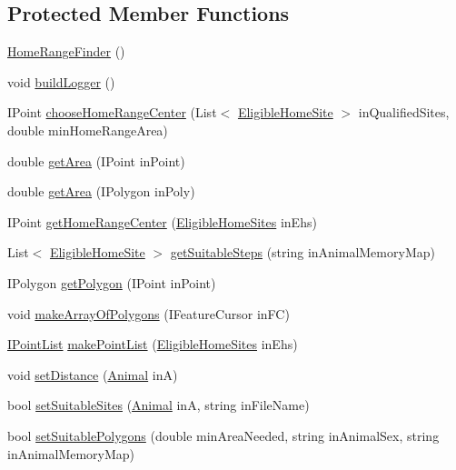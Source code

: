 \subsection*{Protected Member Functions}
\begin{DoxyCompactItemize}
\item 
\hyperlink{class_p_a_z___dispersal_1_1_home_range_finder_a850651d71e9dcdd3434d3696d0f44444}{Home\-Range\-Finder} ()
\item 
void \hyperlink{class_p_a_z___dispersal_1_1_home_range_finder_a0cbe3181c2c10f1f6977404cfd341a66}{build\-Logger} ()
\item 
I\-Point \hyperlink{class_p_a_z___dispersal_1_1_home_range_finder_aea846c132d588fca92f93125f582f30b}{choose\-Home\-Range\-Center} (List$<$ \hyperlink{class_p_a_z___dispersal_1_1_eligible_home_site}{Eligible\-Home\-Site} $>$ in\-Qualified\-Sites, double min\-Home\-Range\-Area)
\item 
double \hyperlink{class_p_a_z___dispersal_1_1_home_range_finder_ac018ed1452fede0440b55d438b7d65af}{get\-Area} (I\-Point in\-Point)
\item 
double \hyperlink{class_p_a_z___dispersal_1_1_home_range_finder_aad3d5999d17350b96371e34df54f5d4e}{get\-Area} (I\-Polygon in\-Poly)
\item 
I\-Point \hyperlink{class_p_a_z___dispersal_1_1_home_range_finder_a8a8b05ea5bf866138c1348ce67dce3c9}{get\-Home\-Range\-Center} (\hyperlink{class_p_a_z___dispersal_1_1_eligible_home_sites}{Eligible\-Home\-Sites} in\-Ehs)
\item 
List$<$ \hyperlink{class_p_a_z___dispersal_1_1_eligible_home_site}{Eligible\-Home\-Site} $>$ \hyperlink{class_p_a_z___dispersal_1_1_home_range_finder_a9a3fc1f66a4ff6aa1308f35eb627fa69}{get\-Suitable\-Steps} (string in\-Animal\-Memory\-Map)
\item 
I\-Polygon \hyperlink{class_p_a_z___dispersal_1_1_home_range_finder_a36671daba651e32270216fa9cc25bfba}{get\-Polygon} (I\-Point in\-Point)
\item 
void \hyperlink{class_p_a_z___dispersal_1_1_home_range_finder_ad778a5dc86e55382437c9ba0f0ea4c73}{make\-Array\-Of\-Polygons} (I\-Feature\-Cursor in\-F\-C)
\item 
\hyperlink{class_p_a_z___dispersal_1_1_i_point_list}{I\-Point\-List} \hyperlink{class_p_a_z___dispersal_1_1_home_range_finder_abc4edacf76d263a46db24799c5a363b7}{make\-Point\-List} (\hyperlink{class_p_a_z___dispersal_1_1_eligible_home_sites}{Eligible\-Home\-Sites} in\-Ehs)
\item 
void \hyperlink{class_p_a_z___dispersal_1_1_home_range_finder_ab62d6052a30874694097c9ca6f464230}{set\-Distance} (\hyperlink{class_p_a_z___dispersal_1_1_animal}{Animal} in\-A)
\item 
bool \hyperlink{class_p_a_z___dispersal_1_1_home_range_finder_a951251e1c31e6fc3f14b8f41dcbc8498}{set\-Suitable\-Sites} (\hyperlink{class_p_a_z___dispersal_1_1_animal}{Animal} in\-A, string in\-File\-Name)
\item 
bool \hyperlink{class_p_a_z___dispersal_1_1_home_range_finder_a2e340dabcd3fe14946087e0677aa366c}{set\-Suitable\-Polygons} (double min\-Area\-Needed, string in\-Animal\-Sex, string in\-Animal\-Memory\-Map)
\end{DoxyCompactItemize}
